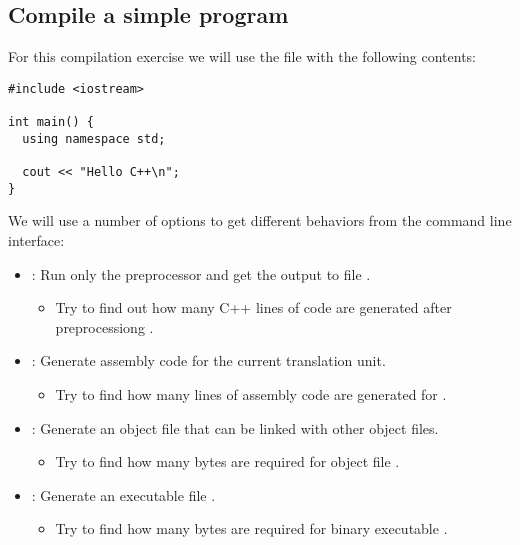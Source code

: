 \subsection{Compile a simple program}

For this compilation exercise we will use the  file with the following contents:

\begin{lstlisting}
#include <iostream>

int main() {
  using namespace std;

  cout << "Hello C++\n";
}
\end{lstlisting}

We will use a number of options to get different behaviors from the  command line interface:

\begin{itemize}
  \item {}: 
  Run only the preprocessor and get the output to file .
    \begin{itemize}
      \item Try to find out how many C++ lines of code are generated after preprocessiong .
    \end{itemize}

  \item {}:
  Generate assembly code for the current translation unit.
    \begin{itemize}
      \item Try to find how many lines of assembly code are generated for .
    \end{itemize}

  \item {}:
  Generate an object file  that can be linked with other object files.
    \begin{itemize}
      \item Try to find how many bytes are required for object file .
    \end{itemize}

  \item {}:
  Generate an executable file .
    \begin{itemize}
      \item Try to find how many bytes are required for binary executable .
    \end{itemize}
\end{itemize}

